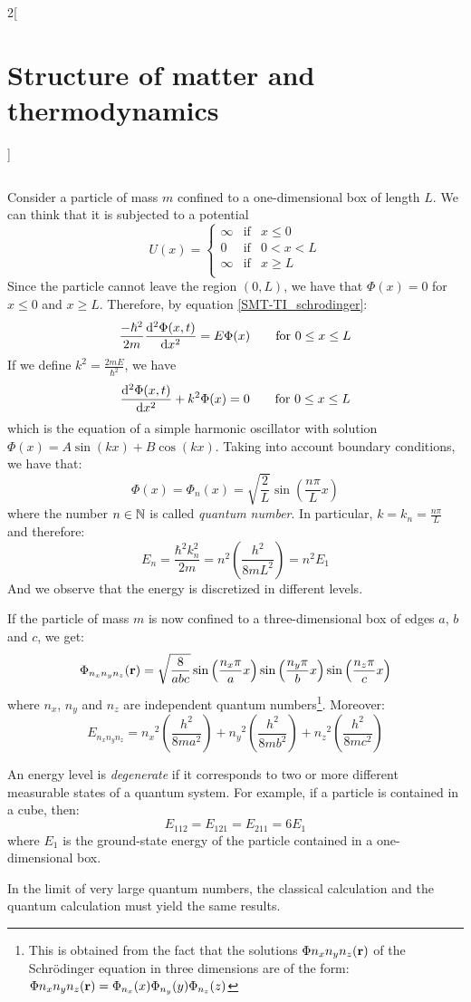 \documentclass[../../../main.tex]{subfiles}
\begin{document}
\begin{multicols}{2}[\section{Structure of matter and thermodynamics}]
\begin{definition}
\begin{equation}
    \end{equation}
  \end{definition}
  \begin{prop}
    Consider a particle of mass $m$ confined to a one-dimensional box of length $L$. We can think that it is subjected to a potential $$U(x)=\left\{
      \begin{array}{lll}
        \infty & \text{if} & x\leq 0   \\
        0      & \text{if} & 0 < x < L \\
        \infty & \text{if} & x\geq L   \\
      \end{array}
      \right.$$
    Since the particle cannot leave the region $(0,L)$, we have that $\Phi(x)=0$ for $x\leq 0$ and $x\geq L$. Therefore, by equation \eqref{SMT-TI_schrodinger}:
    $$
      \frac{-\hbar^2}{2m}\dv[2]{\Phi(x,t)}{x}=E\Phi(x)\qquad\text{for }0\leq x\leq L
    $$
    If we define $k^2=\frac{2m E}{\hbar^2}$, we have
    $$
      \dv[2]{\Phi(x,t)}{x}+k^2\Phi(x)=0\qquad\text{for }0\leq x\leq L
    $$
    which is the equation of a simple harmonic oscillator with solution $\Phi(x)=A\sin(kx)+B\cos(kx)$. Taking into account boundary conditions, we have that: $$\Phi(x)=\Phi_n(x)=\sqrt{\frac{2}{L}}\sin\left(\frac{n\pi}{L}x\right)$$ where the number $n\in\mathbb{N}$ is called \textit{quantum number}. In particular, $k=k_n=\frac{n\pi}{L}$ and therefore: $$E_n=\frac{\hbar^2k_n^2}{2m}=n^2\left(\frac{h^2}{8mL^2}\right)=n^2E_1$$ And we observe that the energy is discretized in different levels.
  \end{prop}
  \begin{prop}
    If the particle of mass $m$ is now confined to a three-dimensional box of edges $a$, $b$ and $c$, we get:
    $$\Phi_{n_xn_yn_z}(\boldsymbol{\mathrm{r}})=\sqrt{\frac{8}{abc}}\sin\left(\frac{n_x\pi}{a}x\right)\sin\left(\frac{n_y\pi}{b}x\right)\sin\left(\frac{n_z\pi}{c}x\right)$$
    where $n_x$, $n_y$ and $n_z$ are independent quantum numbers\footnote{This is obtained from the fact that the solutions $\Phi{n_xn_yn_z}(\boldsymbol{\mathrm{r}})$ of the Schrödinger equation in three dimensions are of the form: $\Phi{n_xn_yn_z}(\boldsymbol{\mathrm{r}})=\Phi_{n_x}(x)\Phi_{n_y}(y)\Phi_{n_z}(z)$}. Moreover:
    $$E_{n_xn_yn_z}={n_x}^2\left(\frac{h^2}{8ma^2}\right)+{n_y}^2\left(\frac{h^2}{8mb^2}\right)+{n_z}^2\left(\frac{h^2}{8mc^2}\right)$$
  \end{prop}
  \begin{definition}
    An energy level is \textit{degenerate} if it corresponds to two or more different measurable states of a quantum system. For example, if a particle is contained in a cube, then: $$E_{112}=E_{121}=E_{211}=6E_1$$ where $E_1$ is the ground-state energy of the particle contained in a one-dimensional box.
  \end{definition}
  \begin{prop}
    In the limit of very large quantum numbers, the classical calculation and the quantum calculation must yield the same results.
  \end{prop}

\end{multicols}
\end{document}
